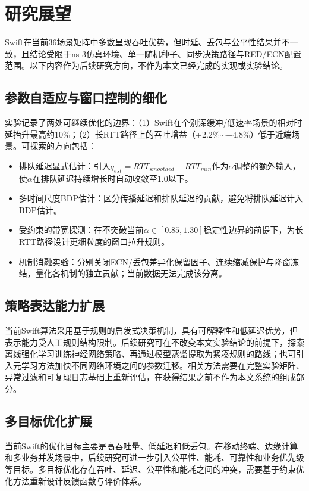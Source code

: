 \section{研究展望}\label{Sec6.2}

Swift在当前36场景矩阵中多数呈现吞吐优势，但时延、丢包与公平性结果并不一致，且结论受限于ns-3仿真环境、单一随机种子、同步决策路径与RED/ECN配置范围。以下内容作为后续研究方向，不作为本文已经完成的实现或实验结论。

\subsection{参数自适应与窗口控制的细化}

实验记录了两处可继续优化的边界：（1）Swift在个别深缓冲/低速率场景的相对时延抬升最高约10\%；（2）长RTT路径上的吞吐增益（+2.2\%$\sim$+4.8\%）低于近端场景。可探索的方向包括：

\begin{itemize}
    \item 排队延迟显式估计：引入$q_{est} = RTT_{smoothed} - RTT_{min}$作为$\alpha$调整的额外输入，使$\alpha$在排队延迟持续增长时自动收敛至1.0以下。
    \item 多时间尺度BDP估计：区分传播延迟和排队延迟的贡献，避免将排队延迟计入BDP估计。
    \item 受约束的带宽探测：在不突破当前$\alpha\in[0.85,1.30]$稳定性边界的前提下，为长RTT路径设计更细粒度的窗口拉升规则。
    \item 机制消融实验：分别关闭ECN/丢包差异化保留因子、连续缩减保护与降窗冻结，量化各机制的独立贡献；当前数据无法完成该分离。
\end{itemize}

\subsection{策略表达能力扩展}

当前Swift算法采用基于规则的启发式决策机制，具有可解释性和低延迟优势，但表示能力受人工规则结构限制。后续研究可在不改变本文实验结论的前提下，探索离线强化学习训练神经网络策略、再通过模型蒸馏提取为紧凑规则的路线；也可引入元学习方法加快不同网络环境之间的参数迁移。相关方法需要在完整实验矩阵、异常过滤和可复现日志基础上重新评估，在获得结果之前不作为本文系统的组成部分。

\subsection{多目标优化扩展}

当前Swift的优化目标主要是高吞吐量、低延迟和低丢包。在移动终端、边缘计算和多业务并发场景中，后续研究可进一步引入公平性、能耗、可靠性和业务优先级等目标。多目标优化存在吞吐、延迟、公平性和能耗之间的冲突，需要基于约束优化方法重新设计反馈函数与评价体系。

